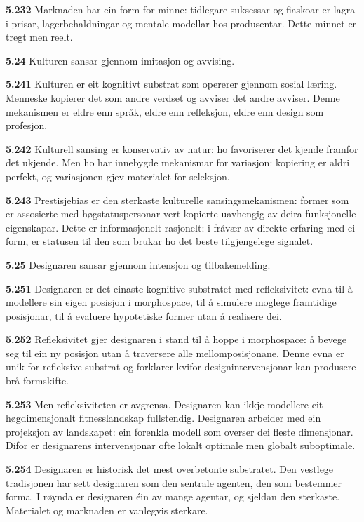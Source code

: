 \documentclass[11pt, a4paper]{article}
\newcommand{\subprop}[1]{\medskip\noindent\textbf{#1}\quad}
\begin{document}
\subprop{5.232} Marknaden har ein form for minne: tidlegare suksessar og fiaskoar er lagra i prisar, lagerbehaldningar og mentale modellar hos produsentar. Dette minnet er tregt men reelt.

\subprop{5.24} Kulturen sansar gjennom imitasjon og avvising.

\subprop{5.241} Kulturen er eit kognitivt substrat som opererer gjennom sosial l\ae ring. Menneske kopierer det som andre verdset og avviser det andre avviser. Denne mekanismen er eldre enn spr\aa k, eldre enn refleksjon, eldre enn design som profesjon.

\subprop{5.242} Kulturell sansing er konservativ av natur: ho favoriserer det kjende framfor det ukjende. Men ho har innebygde mekanismar for variasjon: kopiering er aldri perfekt, og variasjonen gjev materialet for seleksjon.

\subprop{5.243} Prestisjebias er den sterkaste kulturelle sansingsmekanismen: former som er assosierte med h\o gstatuspersonar vert kopierte uavhengig av deira funksjonelle eigenskapar. Dette er informasjonelt rasjonelt: i fr\aa v\ae r av direkte erfaring med ei form, er statusen til den som brukar ho det beste tilgjengelege signalet.

\subprop{5.25} Designaren sansar gjennom intensjon og tilbakemelding.

\subprop{5.251} Designaren er det einaste kognitive substratet med refleksivitet: evna til \aa{} modellere sin eigen posisjon i morphospace, til \aa{} simulere moglege framtidige posisjonar, til \aa{} evaluere hypotetiske former utan \aa{} realisere dei.

\subprop{5.252} Refleksivitet gjer designaren i stand til \aa{} hoppe i morphospace: \aa{} bevege seg til ein ny posisjon utan \aa{} traversere alle mellomposisjonane. Denne evna er unik for refleksive substrat og forklarer kvifor designintervensjonar kan produsere br\aa{} formskifte.

\subprop{5.253} Men refleksiviteten er avgrensa. Designaren kan ikkje modellere eit h\o gdimensjonalt fitnesslandskap fullstendig. Designaren arbeider med ein projeksjon av landskapet: ein forenkla modell som overser dei fleste dimensjonar. Difor er designarens intervensjonar ofte lokalt optimale men globalt suboptimale.

\subprop{5.254} Designaren er historisk det mest overbetonte substratet. Den vestlege tradisjonen har sett designaren som den sentrale agenten, den som bestemmer forma. I r\o ynda er designaren \'ein av mange agentar, og sjeldan den sterkaste. Materialet og marknaden er vanlegvis sterkare.
\end{document}
